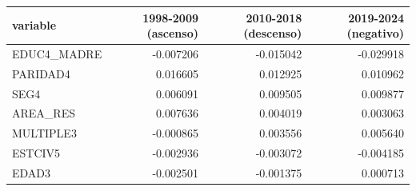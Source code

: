 \begin{tabular}{lrrr}
\toprule
variable & 1998-2009 (ascenso) & 2010-2018 (descenso) & 2019-2024 (negativo) \\
\midrule
EDUC4\_MADRE & -0.007206 & -0.015042 & -0.029918 \\
PARIDAD4 & 0.016605 & 0.012925 & 0.010962 \\
SEG4 & 0.006091 & 0.009505 & 0.009877 \\
AREA\_RES & 0.007636 & 0.004019 & 0.003063 \\
MULTIPLE3 & -0.000865 & 0.003556 & 0.005640 \\
ESTCIV5 & -0.002936 & -0.003072 & -0.004185 \\
EDAD3 & -0.002501 & -0.001375 & 0.000713 \\
\bottomrule
\end{tabular}
